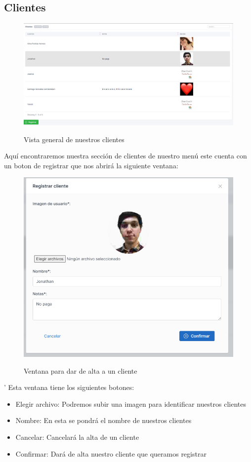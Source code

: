 \documentclass[a4paper,DIV=12]{scrreprt}
\begin{document}
	\clearpage
	
\subsection{Clientes}

	
	\begin{figure}[!htb]
		\centering
		\includegraphics[scale=0.4]{CLIENTES.PNG}\\
		\caption{Vista general de nuestros clientes}
	\end{figure}
	Aquí encontraremos nuestra sección de clientes de nuestro menú este cuenta con un boton de registrar que nos abrirá la siguiente ventana:\\

	
		\begin{figure}[!htb]
		\centering
		\includegraphics[scale=0.4]{REGISTRARCLIENTE.PNG}\\
		\caption{Ventana para dar de alta a un cliente}
	\end{figure}
'
	 Esta ventana tiene los siguientes botones:\\
	 \begin{itemize}
	\item Elegir archivo: Podremos subir una imagen para identificar nuestros clientes
	\item Nombre: En esta se pondrá el nombre de nuestros clientes 
	\item Cancelar: Cancelará la alta de un cliente
	\item Confirmar: Dará de alta nuestro cliente que queramos registrar
	\end{itemize}
\end{document}
